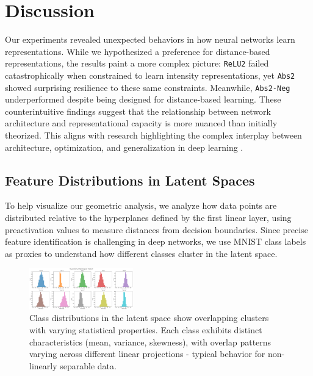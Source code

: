 \section{Discussion}
\label{sec:discussion}

Our experiments revealed unexpected behaviors in how neural networks learn representations. While we hypothesized a preference for distance-based representations, the results paint a more complex picture: \texttt{ReLU2} failed catastrophically when constrained to learn intensity representations, yet \texttt{Abs2} showed surprising resilience to these same constraints. Meanwhile, \texttt{Abs2-Neg} underperformed despite being designed for distance-based learning. These counterintuitive findings suggest that the relationship between network architecture and representational capacity is more nuanced than initially theorized. This aligns with research highlighting the complex interplay between architecture, optimization, and generalization in deep learning \cite{bengio2013representation, jacot2018neural, lee2019wide}.

\subsection{Feature Distributions in Latent Spaces}

To help visualize our geometric analysis, we analyze how data points are distributed relative to the hyperplanes defined by the first linear layer, using preactivation values to measure distances from decision boundaries. Since precise feature identification is challenging in deep networks, we use MNIST class labels as proxies to understand how different classes cluster in the latent space.

\begin{figure}[H]
    \centering
    \includegraphics[width=0.4\textwidth]{images/distance_distribution}
    \caption{Class distributions in the latent space show overlapping clusters with varying statistical properties. Each class exhibits distinct characteristics (mean, variance, skewness), with overlap patterns varying across different linear projections - typical behavior for non-linearly separable data.}
    \label{fig:distance_distribution}
\end{figure}

